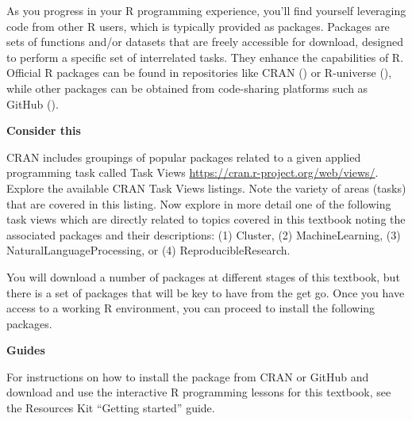 \documentclass[
  letterpaper,
  krantz1]{latex/krantz-mod}
\theoremstyle{definition}
\theoremstyle{definition}
\theoremstyle{remark}
\begin{document}
As you progress in your R programming experience, you'll find yourself
leveraging code from other R users, which is typically provided as
packages. Packages are sets of functions and/or
datasets that are freely accessible for download, designed to perform a
specific set of interrelated tasks. They enhance the capabilities of R.
Official R packages can be found in repositories like
CRAN
() or
R-universe (), while other packages can be obtained from code-sharing platforms
such as GitHub ().

\begin{tcolorbox}[enhanced jigsaw, toprule=.15mm, breakable, colback=white, arc=.35mm, left=2mm, colframe=quarto-callout-color-frame, opacityback=0, bottomrule=.15mm, rightrule=.15mm, leftrule=.75mm]

\textbf{ Consider this}

CRAN includes groupings of
popular packages related to a given applied programming task called Task
Views \url{https://cran.r-project.org/web/views/}. Explore the available
CRAN Task Views listings. Note the variety of areas (tasks) that are
covered in this listing. Now explore in more detail one of the following
task views which are directly related to topics covered in this textbook
noting the associated packages and their descriptions: (1)
Cluster, (2) MachineLearning,
(3) NaturalLanguageProcessing,
or (4) ReproducibleResearch.

\end{tcolorbox}

You will download a number of packages at different stages of this
textbook, but there is a set of packages that will be key to have from
the get go. Once you have access to a working R environment,
you can proceed to install the following packages.

\begin{tcolorbox}[enhanced jigsaw, toprule=.15mm, breakable, colback=white, arc=.35mm, left=2mm, colframe=quarto-callout-color-frame, opacityback=0, bottomrule=.15mm, rightrule=.15mm, leftrule=.75mm]

\textbf{ Guides}

For instructions on how to install the 
package from CRAN or
GitHub and download and use the interactive R programming
lessons for this textbook, see the Resources Kit ``Getting started''
guide.

\end{tcolorbox}
\end{document}
